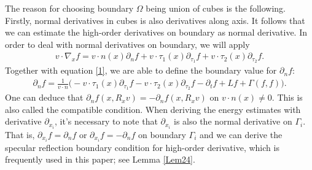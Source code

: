 \documentclass[reqno,a4paper]{amsart}
\numberwithin{equation}{section}
\newcommand{\1}{\mathbf{1}}
\newcommand{\pa}{\partial}
\newcommand{\<}{\langle}
\renewcommand{\>}{\rangle}
\begin{document}
	The reason for choosing boundary $\Omega$ being union of cubes is the following. Firstly, normal derivatives in cubes is also derivatives along axis. It follows that we can estimate the high-order derivatives on boundary as normal derivative. 
In order to deal with normal derivatives on boundary, we will apply 
\begin{align*}
	v\cdot\nabla_xf = v\cdot n(x)\partial_{n}f + v\cdot \tau_1(x)\partial_{\tau_1}f +v\cdot \tau_2(x)\partial_{\tau_2}f. 
\end{align*}
Together with equation \eqref{1}, we are able to define the boundary value for $\pa_nf$:
\begin{align*}
	\partial_nf = \frac{1}{v\cdot n}\Big(-v\cdot \tau_1(x)\partial_{\tau_1}f -v\cdot \tau_2(x)\partial_{\tau_2}f -\partial_tf +Lf +\Gamma(f,f)\Big).
\end{align*} 
One can deduce that $\pa_nf(x,R_xv)=-\pa_nf(x,R_xv)$ on $v\cdot n(x)\neq 0$. 
This is also called the compatible condition. 
When deriving the energy estimates with derivative $\pa_{x_i}$, it's necessary to note that $\pa_{x_i}$ is also the normal derivative on $\Gamma_i$. That is, $\pa_{x_i}f=\pa_nf$ or $\pa_{x_i}f=-\pa_nf$ on boundary $\Gamma_i$ and we can derive the specular reflection boundary condition for high-order derivative, which is frequently used in this paper; see Lemma \ref{Lem24}. 	
\end{document}
